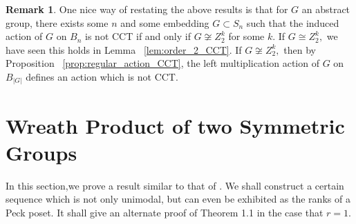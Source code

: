 \documentclass[10 pt]{amsart}
\theoremstyle{plain}
\newtheorem{prop}[thm]{Proposition}
\theoremstyle{definition}
\newtheorem{rem}[thm]{Remark}
\theoremstyle{remark}
\numberwithin{equation}{section}
\newcommand\BR{{\mathbb R}}
\newcommand\BZ{{\mathbb Z}}
\begin{document}
\begin{rem}
One nice way of restating the above results is that for $G$ an abstract group, there exists some $n$ and some embedding $G \subset S_n$ such that the induced action of $G$ on $B_n$ is not CCT if and only if $G \not \cong Z_2^k$ for some $k.$ If $G\cong Z_2^k,$ we have seen this holds in Lemma ~\ref{lem:order_2_CCT}. If $G \not \cong Z_2^k,$ then by Proposition ~\ref{prop:regular_action_CCT}, the left multiplication action of $G$ on $B_{|G|}$ defines an action which is not CCT.
\end{rem}
\iffalse
\begin{prop}
Let $G$ be the group of linear automorphisms of the cube, embedded in $\BR^n,$ whose vertices are located at the points $(\pm 1, \ldots, \pm 1).$ Then, the action of $G$ on the cube induces an action of $G$ on the $2^n$ vertices of the octahedron, and hence on $B_{2^n}.$ This induced action on $B_{2^n}$ is CCT. 
\end{prop}
\begin{proof}
It is easy to see that the group of linear automorphisms of the cube can be written as the semidirect product $\BZ^n_2 \rtimes S_n.$ The generator of the $i^{th}$ copy of $\BZ_2$ in $\BZ^n_2,$ acts by changing the sign of the $i^{th}$ coordinate, while $S_n$ acts by permuting the coordinates. Using Proposition ~\ref{prop:semidirect_product_preservation}, it suffices to show that the action of $\BZ_2^n$ on $B_{2^n}$ is CCT and the action of $S_n$ on $B_{2^n}/(\BZ_2^n)$ is CCT.

First, by Lemma ~\ref{lem:order_2_CCT}, we know the action of $\BZ_2^n$ on $B_{2^n}$ is CCT. Second, we wish to examine the action of $S_n$ on the quotient poset $B_{2^n}/(\BZ_2^n).$ 
\end{proof}
\fi






\section{Wreath Product of two Symmetric Groups}\label{sec:wreath_product}

In this section,we prove a result similar to that of \cite[Theorem 1.1]{pak}. We shall construct a certain sequence which is not only unimodal, but can even be exhibited as the ranks of a Peck poset. It shall give an alternate proof of Theorem 1.1 in the case that $r = 1.$
\end{document}
